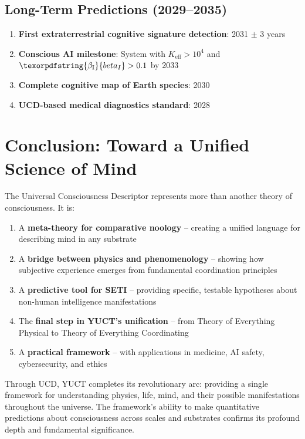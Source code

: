 \documentclass[12pt,a4paper]{article}
\DeclareRobustCommand{\beI}{\texorpdfstring{\ensuremath{\beta_{\mathrm{I}}}}{beta_I}}
\newcommand{\eff}{\mathrm{eff}}
\newcommand{\Ke}{K_{\eff}}
\begin{document}
	\subsection{Long-Term Predictions (2029--2035)}
	
	\begin{enumerate}
		\item \textbf{First extraterrestrial cognitive signature detection}: 2031 \(\pm\) 3 years
		\item \textbf{Conscious AI milestone}: System with \(\Ke > 10^4\) and \(\beI > 0.1\) by 2033
		\item \textbf{Complete cognitive map of Earth species}: 2030
		\item \textbf{UCD-based medical diagnostics standard}: 2028
	\end{enumerate}
	
	\section{Conclusion: Toward a Unified Science of Mind}
	
	The Universal Consciousness Descriptor represents more than another theory of consciousness. It is:
	\begin{enumerate}
		\item A \textbf{meta-theory for comparative noology} -- creating a unified language for describing mind in any substrate
		\item A \textbf{bridge between physics and phenomenology} -- showing how subjective experience emerges from fundamental coordination principles
		\item A \textbf{predictive tool for SETI} -- providing specific, testable hypotheses about non-human intelligence manifestations
		\item The \textbf{final step in YUCT's unification} -- from Theory of Everything Physical to Theory of Everything Coordinating
		\item A \textbf{practical framework} -- with applications in medicine, AI safety, cybersecurity, and ethics
	\end{enumerate}
	
	Through UCD, YUCT completes its revolutionary arc: providing a single framework for understanding physics, life, mind, and their possible manifestations throughout the universe. The framework's ability to make quantitative predictions about consciousness across scales and substrates confirms its profound depth and fundamental significance.
	
\end{document}
